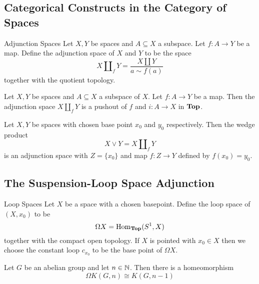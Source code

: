 \documentclass[a4paper]{article}
\begin{document}
\subsection{Categorical Constructs in the Category of Spaces}
\begin{defn}{Adjunction Spaces}{} Let $X,Y$ be spaces and $A\subseteq X$ a subspace. Let $f:A\to Y$ be a map. Define the adjunction space of $X$ and $Y$ to be  the space $$X\amalg_fY=\frac{X\amalg Y}{a\sim f(a)}$$ together with the quotient topology. 
\end{defn}

\begin{prp}{}{} Let $X,Y$ be spaces and $A\subseteq X$ a subspace of $X$. Let $f:A\to Y$ be a map. Then the adjunction space $X\amalg_f Y$ is a pushout of $f$ and $i:A\to X$ in $\bold{Top}$. 
\end{prp}

\begin{prp}{}{} Let $X,Y$ be spaces with chosen base point $x_0$ and $y_0$ respectively. Then the wedge product $$X\vee Y=X\amalg_fY$$ is an adjunction space with $Z=\{x_0\}$ and map $f:Z\to Y$ defined by $f(x_0)=y_0$. 
\end{prp}

\subsection{The Suspension-Loop Space Adjunction}
\begin{defn}{Loop Spaces}{} Let $X$ be a space with a chosen basepoint. Define the loop space of $(X,x_0)$ to be $$\Omega X=\operatorname{Hom}_\bold{Top}(S^1,X)$$ together with the compact open topology. If $X$ is pointed with $x_0\in X$ then we choose the constant loop $c_{x_0}$ to be the base point of $\Omega X$. 
\end{defn}

\begin{lmm}{}{} Let $G$ be an abelian group and let $n\in\mathbb{N}$. Then there is a homeomorphism $$\Omega K(G,n)\cong K(G,n-1)$$
\end{lmm}
\end{document}
